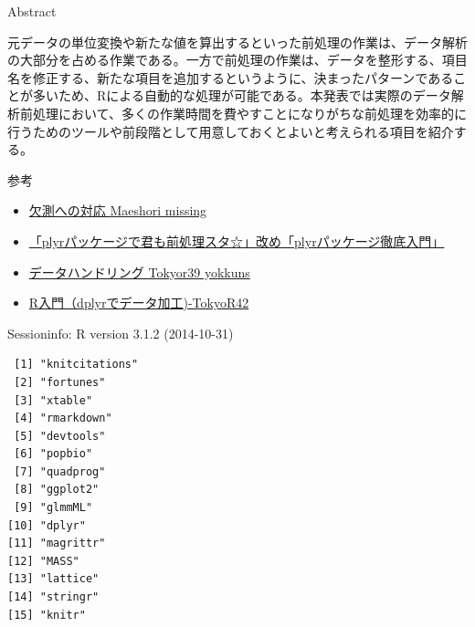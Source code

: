 \documentclass[17pt,ignorenonframetext,]{beamer}
\begin{document}
\begin{frame}


\end{frame}

\begin{frame}


\end{frame}

\begin{frame}{Abstract}

元データの単位変換や新たな値を算出するといった前処理の作業は、データ解析の大部分を占める作業である。一方で前処理の作業は、データを整形する、項目名を修正する、新たな項目を追加するというように、決まったパターンであることが多いため、Rによる自動的な処理が可能である。本発表では実際のデータ解析前処理において、多くの作業時間を費やすことになりがちな前処理を効率的に行うためのツールや前段階として用意しておくとよいと考えられる項目を紹介する。

\end{frame}

\begin{frame}{参考}

\begin{itemize}
\itemsep1pt\parskip0pt
\item
  \href{http://www.slideshare.net/dichika/maeshori-missing}{欠測への対応
  Maeshori missing}
\item
  \href{http://www.slideshare.net/teramonagi/tokyo-r30-20130420}{「plyrパッケージで君も前処理スタ☆」改め「plyrパッケージ徹底入門」}
\item
  \href{http://www.slideshare.net/yokkuns/tokyor39-yokkuns}{データハンドリング
  Tokyor39 yokkuns}
\item
  \href{http://www.slideshare.net/gepuro/rdplyrtokyor42}{R入門（dplyrでデータ加工)-TokyoR42}
\end{itemize}

\end{frame}

\begin{frame}[fragile]{\small{Sessioninfo: R version 3.1.2 (2014-10-31)}}

\begin{verbatim}
 [1] "knitcitations"
 [2] "fortunes"     
 [3] "xtable"       
 [4] "rmarkdown"    
 [5] "devtools"     
 [6] "popbio"       
 [7] "quadprog"     
 [8] "ggplot2"      
 [9] "glmmML"       
[10] "dplyr"        
[11] "magrittr"     
[12] "MASS"         
[13] "lattice"      
[14] "stringr"      
[15] "knitr"        
\end{verbatim}

\end{frame}
\end{document}
